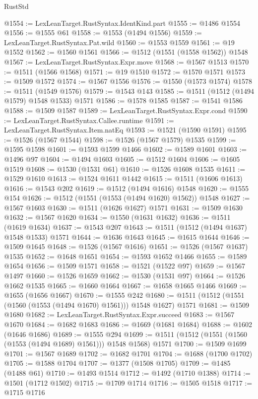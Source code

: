 \begin{lexlean}{RustStd}
\begin{coremodule}
{{@1554 := LexLeanTarget.RustSyntax.IdentKind.part
@1555 := @1486 @1554
@1556 := @1555 @61
@1558 := @1553 (@1494 @1556)
@1559 := LexLeanTarget.RustSyntax.Pat.wild
@1560 := @1553 @1559
@1561 := @19 @1552
@1562 := @1560 @1561
@1566 := @1512 (@1551 (@1558 @1562)) @1548
@1567 := LexLeanTarget.RustSyntax.Expr.move
@1568 := @1567 @1513
@1570 := @1511 (@1566 @1568)
@1571 := @19 @1510
@1572 := @1570 @1571
@1573 := @1509 @1572
@1574 := @1567 @1556
@1576 := @1550 (@1573 @1574)
@1578 := @1511 (@1549 @1576)
@1579 := @1543 @143
@1585 := @1511 (@1512 (@1494 @1579) @1548 @1533) @1571
@1586 := @1578 @1585
@1587 := @1541 @1586
@1588 := @1509 @1587
@1589 := LexLeanTarget.RustSyntax.Expr.cond
@1590 := LexLeanTarget.RustSyntax.Callee.runtime
@1591 := LexLeanTarget.RustSyntax.Item.natEq
@1593 := @1521 (@1590 @1591)
@1595 := @1526 (@1567 @1544)
@1598 := @1526 (@1567 @1579) @1535
@1599 := @1595 @1598
@1601 := @1593 @1599 @1466
@1602 := @1589 @1601
@1603 := @1496 @97
@1604 := @1494 @1603
@1605 := @1512 @1604
@1606 := @1605 @1519
@1608 := @1530 (@1531 @61)
@1610 := @1526 @1608 @1535
@1611 := @1529 @1610
@1613 := @1524 @1611 @1442
@1615 := @1511 (@1606 @1613)
@1616 := @1543 @202
@1619 := @1512 (@1494 @1616) @1548
@1620 := @1555 @154
@1626 := @1512 (@1551 (@1553 (@1494 @1620) @1562)) @1548
@1627 := @1567 @1603
@1630 := @1511 (@1626 @1627) @1571
@1631 := @1509 @1630
@1632 := @1567 @1620
@1634 := @1550 (@1631 @1632)
@1636 := @1511 (@1619 @1634)
@1637 := @1543 @207
@1643 := @1511 (@1512 (@1494 @1637) @1548 @1533) @1571
@1644 := @1636 @1643
@1645 := @1615 @1644
@1646 := @1509 @1645
@1648 := @1526 (@1567 @1616)
@1651 := @1526 (@1567 @1637) @1535
@1652 := @1648 @1651
@1654 := @1593 @1652 @1466
@1655 := @1589 @1654
@1656 := @1509 @1571
@1658 := @1521 (@1522 @97)
@1659 := @1567 @1497
@1660 := @1526 @1659
@1662 := @1530 (@1531 @97)
@1664 := @1526 @1662 @1535
@1665 := @1660 @1664
@1667 := @1658 @1665 @1466
@1669 := @1655 (@1656 @1667)
@1670 := @1555 @242
@1680 := @1511 (@1512 (@1551 (@1560 (@1553 (@1494 @1670) @1561))) @1548 @1627) @1571
@1681 := @1509 @1680
@1682 := LexLeanTarget.RustSyntax.Expr.succeed
@1683 := @1567 @1670
@1684 := @1682 @1683
@1686 := @1669 (@1681 @1684)
@1688 := @1602 (@1646 @1686)
@1689 := @1555 @294
@1699 := @1511 (@1512 (@1551 (@1560 (@1553 (@1494 @1689) @1561))) @1548 @1568) @1571
@1700 := @1509 @1699
@1701 := @1567 @1689
@1702 := @1682 @1701
@1704 := @1688 (@1700 @1702)
@1705 := @1588 @1704
@1707 := @1377 (@1508 @1705)
@1709 := @1485 (@1488 @61)
@1710 := @1493 @1514
@1712 := @1492 (@1710 @1388)
@1714 := @1501 (@1712 @1502)
@1715 := @1709 @1714
@1716 := @1505 @1518
@1717 := @1715 @1716
}}
\end{coremodule}
\end{lexlean}
